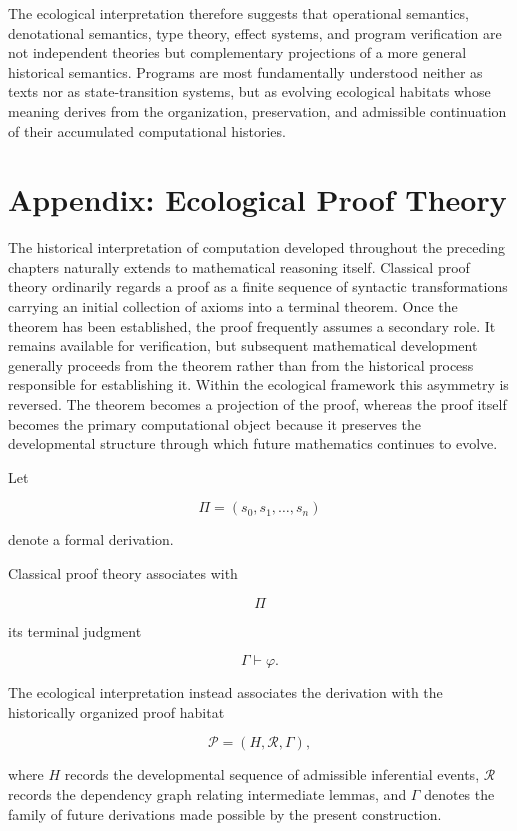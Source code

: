 \documentclass[12pt,oneside]{article}
\theoremstyle{remark}
\begin{document}
The ecological interpretation therefore suggests that operational semantics,
denotational semantics, type theory, effect systems, and program verification
are not independent theories but complementary projections of a more general
historical semantics. Programs are most fundamentally understood neither as
texts nor as state-transition systems, but as evolving ecological habitats whose
meaning derives from the organization, preservation, and admissible continuation
of their accumulated computational histories.

\section{Appendix: Ecological Proof Theory}

The historical interpretation of computation developed throughout the preceding
chapters naturally extends to mathematical reasoning itself. Classical proof
theory ordinarily regards a proof as a finite sequence of syntactic
transformations carrying an initial collection of axioms into a terminal
theorem. Once the theorem has been established, the proof frequently assumes a
secondary role. It remains available for verification, but subsequent
mathematical development generally proceeds from the theorem rather than from
the historical process responsible for establishing it. Within the ecological
framework this asymmetry is reversed. The theorem becomes a projection of the
proof, whereas the proof itself becomes the primary computational object because
it preserves the developmental structure through which future mathematics
continues to evolve.

Let

\[
\Pi
=
(s_0,s_1,\ldots,s_n)
\]

denote a formal derivation.

Classical proof theory associates with

\[
\Pi
\]

its terminal judgment

\[
\Gamma
\vdash
\varphi.
\]

The ecological interpretation instead associates the derivation with the
historically organized proof habitat

\[
\mathcal P
=
(H,\mathcal R,\Gamma),
\]

where \(H\) records the developmental sequence of admissible inferential
events, \(\mathcal R\) records the dependency graph relating intermediate
lemmas, and \(\Gamma\) denotes the family of future derivations made possible by
the present construction.
\end{document}
